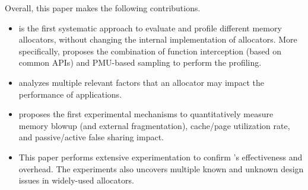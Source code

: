 Overall, this paper makes the following contributions. 

\begin{itemize}
\item \MP{} is the first systematic approach to evaluate and profile different memory allocators, without changing the internal implementation of allocators. More specifically, \MP{} proposes the combination of function interception (based on common APIs) and PMU-based sampling to perform the profiling.


\item \MP{} analyzes multiple relevant factors that an allocator may impact the performance of applications.

\item \MP{} proposes the first experimental mechanisms to quantitatively measure memory blowup (and external fragmentation), cache/page utilization rate, and passive/active false sharing impact. 
\item This paper performs extensive experimentation to confirm \MP{}'s effectiveness and overhead. The experiments also uncovers multiple known and unknown design issues in widely-used allocators.  

\end{itemize} 


